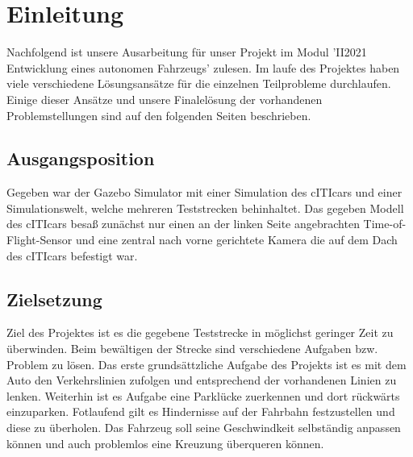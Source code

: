 \section{Einleitung}

Nachfolgend ist unsere Ausarbeitung für unser Projekt im Modul  'II2021 Entwicklung eines autonomen Fahrzeugs' zulesen. Im laufe des Projektes haben viele verschiedene Lösungsansätze für die einzelnen Teilprobleme durchlaufen. Einige dieser Ansätze und unsere Finalelösung der vorhandenen Problemstellungen sind auf den folgenden Seiten beschrieben.

\subsection{Ausgangsposition}
    
Gegeben war der Gazebo Simulator mit einer Simulation des cITIcars und einer Simulationswelt, welche mehreren Teststrecken behinhaltet. Das gegeben Modell des cITIcars besaß zunächst nur einen an der linken Seite angebrachten Time-of-Flight-Sensor und eine zentral nach vorne gerichtete Kamera die auf dem Dach des cITIcars befestigt war.

\subsection{Zielsetzung}

Ziel des Projektes ist es die gegebene Teststrecke in möglichst geringer Zeit zu überwinden. Beim bewältigen der Strecke sind verschiedene Aufgaben bzw. Problem zu lösen. Das erste grundsättzliche Aufgabe des Projekts ist es mit dem Auto den Verkehrslinien zufolgen und entsprechend der vorhandenen Linien   zu lenken. Weiterhin ist es Aufgabe eine Parklücke zuerkennen und dort rückwärts einzuparken. Fotlaufend gilt es Hindernisse auf der Fahrbahn festzustellen und diese zu überholen. Das Fahrzeug soll seine Geschwindkeit selbständig anpassen können und auch problemlos eine Kreuzung überqueren können. 